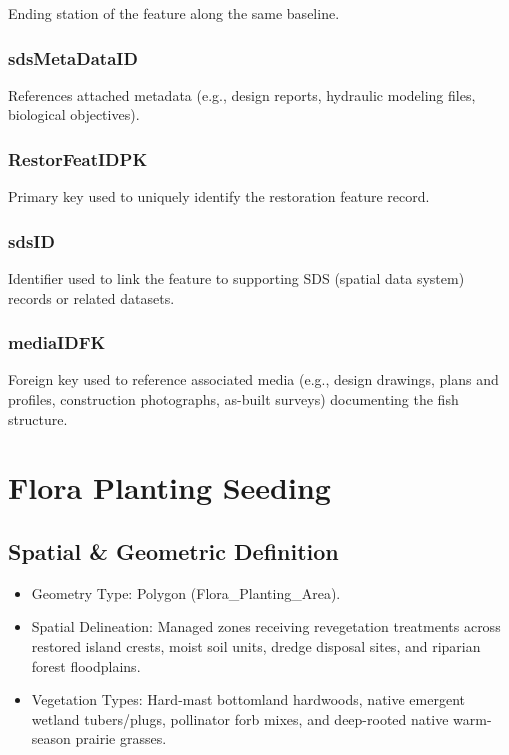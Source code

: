 \documentclass[
  letterpaper,
  DIV=11,
  numbers=noendperiod]{scrreprt}
\begin{document}
Ending station of the feature along the same baseline.

\subsection{sdsMetaDataID}\label{sdsmetadataid-3}

References attached metadata (e.g., design reports, hydraulic modeling
files, biological objectives).

\subsection{RestorFeatIDPK}\label{restorfeatidpk-3}

Primary key used to uniquely identify the restoration feature record.

\subsection{sdsID}\label{sdsid-3}

Identifier used to link the feature to supporting SDS (spatial data
system) records or related datasets.

\subsection{mediaIDFK}\label{mediaidfk-3}

Foreign key used to reference associated media (e.g., design drawings,
plans and profiles, construction photographs, as-built surveys)
documenting the fish structure.

\chapter{Flora Planting Seeding}\label{flora-planting-seeding}

\section{Spatial \& Geometric
Definition}\label{spatial-geometric-definition-4}

\begin{itemize}
\item
  Geometry Type: Polygon (Flora\_Planting\_Area).
\item
  Spatial Delineation: Managed zones receiving revegetation treatments
  across restored island crests, moist soil units, dredge disposal
  sites, and riparian forest floodplains.
\item
  Vegetation Types: Hard-mast bottomland hardwoods, native emergent
  wetland tubers/plugs, pollinator forb mixes, and deep-rooted native
  warm-season prairie grasses.
\end{itemize}
\end{document}
